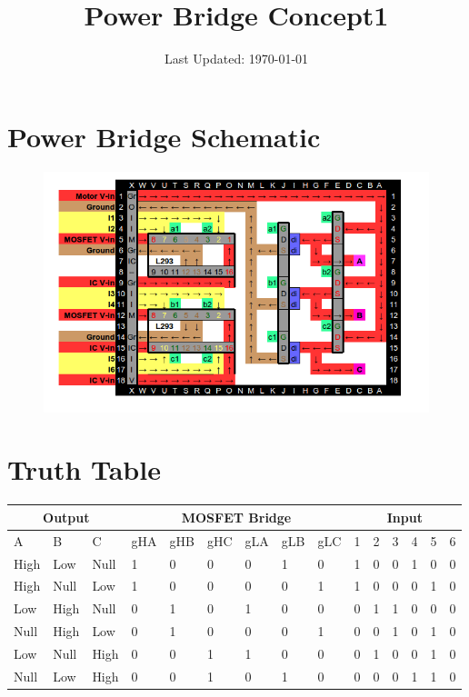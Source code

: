 \documentclass[a4paper]{article}
\title{Power Bridge Concept1}
\date{Last Updated: \today}
\begin{document}
\pagestyle{fancy} \lhead{} \rhead{}
\maketitle

\section{Power Bridge Schematic}
\begin{figure}[h!]
  \centering
  \includegraphics[width=\linewidth]{schematics/powerBridge}
\end{figure}

\section{Truth Table}
  \small
\begin{tabular}{lll|llllll|llllll} \hline
  \multicolumn{3}{c}{Output} & \multicolumn{6}{c}{MOSFET Bridge} & \multicolumn{6}{c}{Input}\\
  \hline
  A & B & C & gHA & gHB & gHC & gLA & gLB & gLC & 1 & 2 & 3 & 4 & 5 & 6 \\
  \hline
  High & Low & Null & 1 & 0 & 0 & 0 & 1 & 0 & 1 & 0 & 0 & 1 & 0 & 0\\
  High & Null & Low & 1 & 0 & 0 & 0 & 0 & 1 & 1 & 0 & 0 & 0 & 1 & 0\\
  Low & High & Null & 0 & 1 & 0 & 1 & 0 & 0 & 0 & 1 & 1 & 0 & 0 & 0\\
  Null & High & Low & 0 & 1 & 0 & 0 & 0 & 1 & 0 & 0 & 1 & 0 & 1 & 0\\
  Low & Null & High & 0 & 0 & 1 & 1 & 0 & 0 & 0 & 1 & 0 & 0 & 1 & 0\\
  Null & Low & High & 0 & 0 & 1 & 0 & 1 & 0 & 0 & 0 & 0 & 1 & 1 & 0\\
  \hline
\end{tabular}
\newpage
\end{document}
